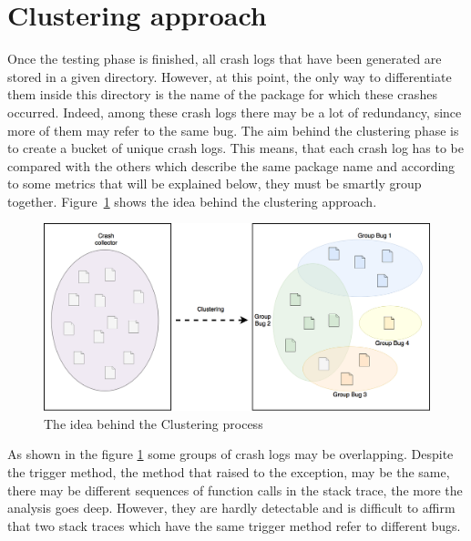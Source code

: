 \section{Clustering approach}
\label{approach:clustering}
Once the testing phase is finished, all crash logs that have been generated are stored in a given directory. 
However, at this point, the only way to differentiate them inside this directory is the name of the package for which these crashes occurred. 
Indeed, among these crash logs there may be a lot of redundancy, since more of them may refer to the same bug. 
The aim behind the clustering phase is to create a bucket of unique crash logs. 
This means, that each crash log has to be compared with the others which describe the same package name and according to some metrics that will be explained below, they must be smartly group together. Figure~\ref{fig: clustering} shows the idea behind the clustering approach. 
\begin{figure}[tb]
\centering 
\includegraphics[width=\columnwidth]{imgs/clusteringidea} 
\caption{The idea behind the Clustering process}
\label{fig: clustering}
\end{figure}
As shown in the figure \ref{fig: clustering} some groups of crash logs may be overlapping. 
Despite the trigger method, \ie the method that raised to the exception, may be the same, there may be different sequences of function calls in the stack trace, the more the analysis goes deep. 
However, they are hardly detectable and is difficult to affirm that two stack traces which have the same trigger method refer to different bugs. 


